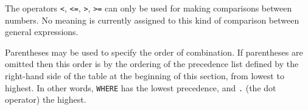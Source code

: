 The operators \texttt{<}, \texttt{<=}, \texttt{>}, \texttt{>=}
can only be used for making comparisons between numbers.  No meaning is
currently assigned to this kind of comparison between general expressions.

Parentheses may be used to specify the order of combination.  If
parentheses are omitted then this order is by the ordering of the
precedence list defined by the right-hand side
of the  table
at the beginning of this section,
from lowest to highest.  In other words, \texttt{WHERE} has the lowest
precedence, and \texttt{.} (the dot operator) the highest.

